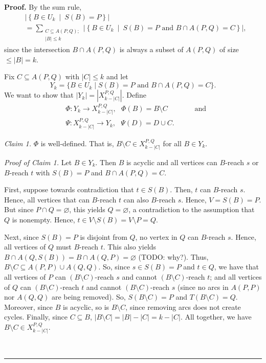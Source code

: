 \documentclass[numbers=enddot,12pt,final,onecolumn,notitlepage]{scrartcl}%
\theoremstyle{definition}
\newenvironment{proof}[1][Proof]{\noindent\textbf{#1.} }{\ \rule{0.5em}{0.5em}}
\let\sumnonlimits\sum
\renewcommand{\sum}{\sumnonlimits\limits}
\theoremstyle{plainsl}
\begin{document}
\begin{proof}
    By the sum rule,
	\begin{align*}
&  \left\vert \left\{  B\in U_{k}\ \mid\ S\left(  B\right)  =P\right\}
\right\vert \\
&  =\sum_{\substack{C\subseteq A\left(  P,Q\right); \\ \left|B\right| \leq k}  }\left\vert \left\{  B\in
U_{k}\ \mid\ S\left(  B\right)  =P\text{ and }B\cap A\left(  P,Q\right)
=C\right\}  \right\vert ,
\end{align*}
since the intersection $B\cap A\left(  P,Q\right)  $ is always a subset of
$A\left(  P,Q\right)  $ of size $\leq \left|B\right| = k$.

Fix $C \subseteq A(P,Q)$ with $|C| \leq k$ and let \begin{equation*}
    Y_k = \{B \in U_{k} \mid  S(B) = P \text{ and } B \cap A(P,Q) = C\}.
\end{equation*} We want to show that $|Y_k| = |X_{k-|C|}^{P,Q}|$. Define \begin{align*}
    &\Phi : Y_k \to X_{k-|C|}^{P,Q}, \ \ \ \Phi(B) = B \setminus C \ \ \ \ \ \ \ \ \ \ \ \ \ \ \ \ \ \text{and} \\
    &\Psi : X_{k-|C|}^{P,Q} \to Y_{k}, \ \ \ \Psi(D) = D \cup C.
\end{align*}

\textit{Claim 1.} $\Phi$ is well-defined. That is, $B \setminus C \in X_{k-|C|}^{P,Q}$ for all $B \in Y_{k}$.

\smallskip
\textit{Proof of Claim 1.} Let $B \in Y_{k}$. Then $B$ is acyclic and all vertices can $B$-reach $s$ or $B$-reach $t$ with $S(B) = P$ and $B \cap A(P,Q) = C$.

First, suppose towards contradiction that $t \in S(B)$. Then, $t$ can $B$-reach $s$. Hence, all vertices that can $B$-reach $t$ can also $B$-reach $s$. Hence, $V = S(B) = P$. But since $P \cap Q = \varnothing$, this yields $Q = \varnothing$, a contradiction to the assumption that $Q$ is nonempty. Hence, $t \in V \setminus S(B) = V \setminus P = Q$. 

Next, since $S(B) = P$ is disjoint from $Q$, no vertex in $Q$ can $B$-reach $s$. Hence, all vertices of $Q$ must $B$-reach $t$. This also yields $B \cap A(Q,S(B)) = B \cap A(Q,P) = \varnothing$ (TODO: why?). Thus, $B \setminus C \subseteq A(P,P) \cup A(Q,Q)$. So, since $s \in S(B) = P$ and $t \in Q$, we have that all vertices of $P$ can $(B \setminus C)$-reach $s$ and cannot $(B \setminus C)$-reach $t$; and all vertices of $Q$ can $(B \setminus C)$-reach $t$ and cannot $(B \setminus C)$-reach $s$ (since no arcs in $A(P,P)$ nor $A(Q,Q)$ are being removed). So, $S(B \setminus C) = P$ and $T(B \setminus C) = Q$. Moreover, since $B$ is acyclic, so is $B \setminus C$, since removing arcs does not create cycles. Finally, since $C \subseteq B$, $|B \setminus C| = |B|-|C| = k-|C|$. All together, we have $B \setminus C \in X_{k-|C|}^{P,Q}$.


\end{proof}
\end{document}
